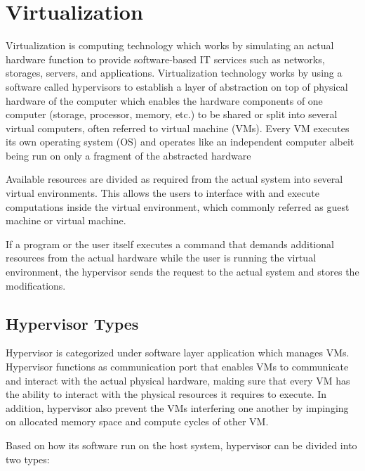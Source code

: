 \documentclass[../index.tex]{subfiles}
\begin{document}
\section{Virtualization}

Virtualization is computing technology which works by simulating an actual hardware function to
provide software-based IT services such as networks, storages, servers, and applications.
Virtualization technology works by using a software called hypervisors to establish a layer of
abstraction on top of physical hardware of the computer which enables the hardware components of one
computer (storage, processor, memory, etc.) to be shared or split into several virtual computers,
often referred to virtual machine (VMs). Every VM executes its own operating system (OS) and
operates like an independent computer albeit being run on only a fragment of the abstracted hardware

Available resources are divided as required from the actual system into several virtual
environments. This allows the users to interface with and execute computations inside the virtual
environment, which commonly referred as guest machine or virtual machine.

If a program or the user itself executes a command that demands additional resources from the actual
hardware while the user is running the virtual environment, the hypervisor sends the request to the
actual system and stores the modifications.

\subsection{Hypervisor Types}

Hypervisor is categorized under software layer application which manages VMs. Hypervisor functions
as communication port that enables VMs to communicate and interact with the actual physical
hardware, making sure that every VM has the ability to interact with the physical resources it
requires to execute. In addition, hypervisor also prevent the VMs interfering one another by
impinging on allocated memory space and compute cycles of other VM.

Based on how its software run on the host system, hypervisor can be divided into two types:
\end{document}
